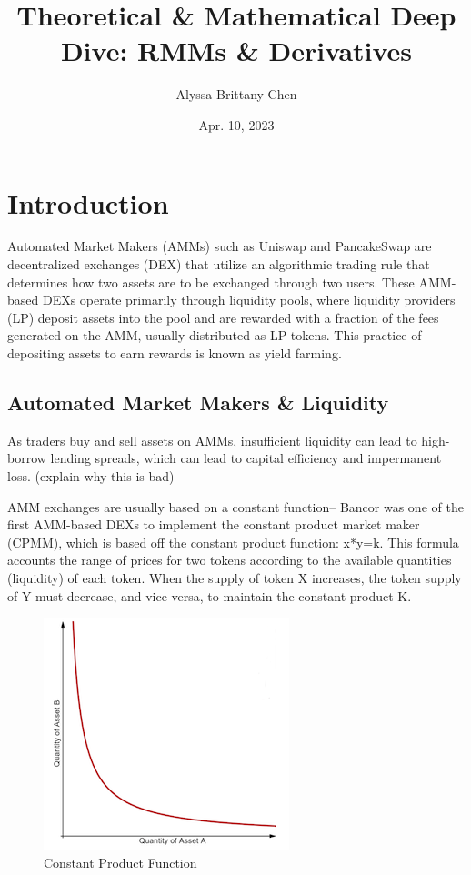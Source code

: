 \documentclass[12pt]{article}
\title{Theoretical \& Mathematical Deep Dive: RMMs \& Derivatives}
\author{Alyssa Brittany Chen}
\date{Apr. 10, 2023}
\begin{document}
\maketitle


\tableofcontents

\newpage

\section{Introduction}
Automated Market Makers (AMMs) such as Uniswap and PancakeSwap are decentralized exchanges (DEX) that utilize an algorithmic trading rule that determines how two assets are to be exchanged through two users. These AMM-based DEXs operate primarily through liquidity pools, where liquidity providers (LP) deposit assets into the pool and are rewarded with a fraction of the fees generated on the AMM, usually distributed as LP tokens. This practice of depositing assets to earn rewards is known as yield farming. 

\subsection{Automated Market Makers \& Liquidity}
As traders buy and sell assets on AMMs, insufficient liquidity can lead to high-borrow lending spreads, which can lead to capital efficiency and impermanent loss. (explain why this is bad) 

AMM exchanges are usually based on a constant function– Bancor was one of the first AMM-based DEXs to implement the constant product market maker (CPMM), which is based off the constant product function: x*y=k. This formula accounts the range of prices for two tokens according to the available quantities (liquidity) of each token. When the supply of token X increases, the token supply of Y must decrease, and vice-versa, to maintain the constant product K. 
\begin{figure}[H]
    \centering
    \includegraphics[width=0.5\linewidth]{constant_product.png}
    \caption{Constant Product Function}
    \label{fig:constant_product}
\end{figure}
\end{document}
